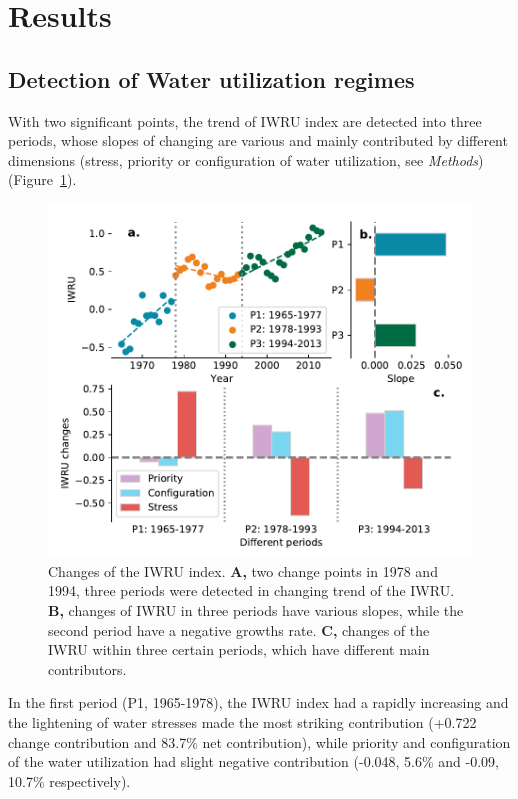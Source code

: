 \documentclass[9pt, twocolumn, twoside, lineno]{pnas-new}
\begin{document}
\section*{Results}
\subsection*{Detection of Water utilization regimes}
With two significant points, the trend of IWRU index are detected into three periods, whose slopes of changing are various and mainly contributed by different dimensions (stress, priority or configuration of water utilization, see \textit{Methods}) (Figure~\ref{fig:IWRU}).
\begin{figure}%
	\centering
	\includegraphics[width=\linewidth]{../../figures/main/index.pdf}
	\caption{Changes of the IWRU index. 
	\textbf{A,} two change points in 1978 and 1994, three periods were detected in changing trend of the IWRU.
	\textbf{B,} changes of IWRU in three periods have various slopes, while the second period have a negative growths rate.
	\textbf{C,} changes of the IWRU within three certain periods, which have different main contributors.
	}
	\label{fig:IWRU}
\end{figure}
In the first period (P1, 1965-1978), the IWRU index had a rapidly increasing and the lightening of water stresses made the most striking contribution (+0.722 change contribution and 83.7\% net contribution), while priority and configuration of the water utilization had slight negative contribution (-0.048, 5.6\% and -0.09, 10.7\% respectively).
\end{document}
